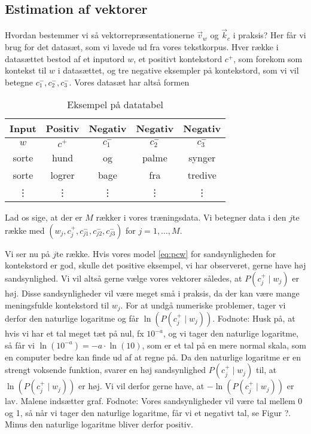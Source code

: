 \documentclass{article}
\newcommand{\am}[1]{{\color{red} #1}}
\begin{document}
\subsection*{Estimation af vektorer}
Hvordan bestemmer vi så vektorrepræsentationerne $\overrightarrow{v}_{w}$ og $\overrightarrow{k}_{c}$ i praksis? Her får vi brug for det datasæt, som vi lavede ud fra vores tekstkorpus. Hver række i  datasættet bestod af et inputord $w$, et positivt kontekstord $c^{+}$, som forekom som kontekst til $w$ i datasættet, og tre negative eksempler på  kontekstord, som vi vil betegne  $c_{1}^-,c_{2}^-,c_{3}^-$.  Vores datasæt har altså formen
\begin{table}[h]
\begin{center}
\begin{tabular}{ccccc}
{Input} & {Positiv} & Negativ & Negativ & Negativ \\ \hline
$w$ & $c^{+}$ & $c^-_{1}$ & $c_{2}^-$ & $c_{3}^-$  \\
\hline
sorte & hund & og & palme & synger \\
sorte & logrer & bage  & fra & tredive\\
\vdots & \vdots & \vdots & \vdots &\vdots\\
\end{tabular}
\end{center}
\caption{Eksempel på datatabel}\label{tab:data}
\end{table}

Lad os sige, at der er $M$ rækker i vores træningsdata. Vi betegner data i den $j$te række med   $(w_j,c_j^+,c_{j1}^-,c_{j2}^-,c_{j3}^-)$ for $j=1,\ldots,M$.

 Vi ser nu på $j$te række. Hvis vores model \eqref{eq:pcw} for sandsynligheden for kontekstord er god, skulle det positive eksempel, vi har observeret, gerne have høj sandsynlighed. Vi vil altså gerne vælge vores vektorer således, at $P(c_j^+\mid w_j)$ er høj. Disse sandsynligheder vil være meget små i praksis, da der kan være mange meningsfulde kontekstord til $w_j$. For at undgå numeriske problemer, tager vi derfor den naturlige logaritme og får $\ln (P(c_j^+\mid w_j))$. \am{Fodnote: Husk på, at hvis vi har et tal meget tæt på nul, fx $10^{-a}$, og vi tager den naturlige logaritme, så får vi $\ln(10^{-a}) = -a\cdot \ln(10)$, som er et tal på en mere normal skala, som en computer bedre kan finde ud af at regne på.} Da den naturlige logaritme er en strengt voksende funktion, svarer en høj sandsynlighed $P(c_j^+\mid w_j)$ til, at $\ln(P(c_j^+\mid w_j))$ er høj. Vi vil derfor gerne have, at $-\ln(P(c_j^+\mid w_j))$ er lav.\am{Malene indsætter graf. Fodnote: Vores sandsynligheder vil være tal mellem 0 og 1, så når vi tager den naturlige logaritme,  får vi et negativt tal, se Figur ?. Minus den naturlige logaritme bliver derfor positiv.}
\end{document}

